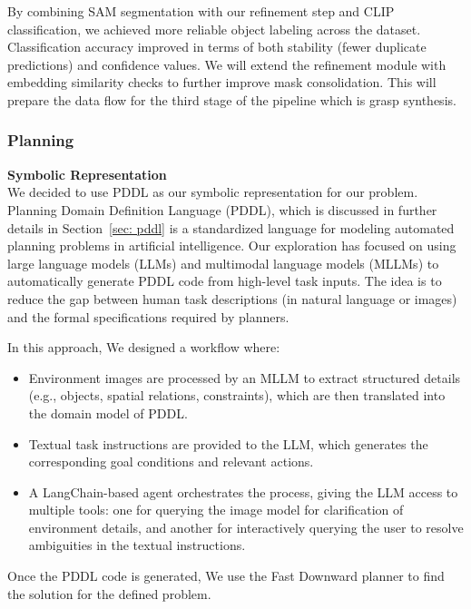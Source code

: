 \documentclass[12pt]{extarticle}
\begin{document}
By combining SAM segmentation with our refinement step and CLIP classification, we achieved more reliable object labeling across the dataset. Classification accuracy improved in terms of both stability (fewer duplicate predictions) and confidence values. We will extend the refinement module with embedding similarity checks to further improve mask consolidation. This will prepare the data flow for the third stage of the pipeline which is grasp synthesis.





\subsubsection{Planning}

\textbf{Symbolic Representation} \\
We decided to use PDDL as our symbolic representation for our problem. Planning Domain Definition Language (PDDL), which is discussed in further details in Section~\ref{sec: pddl} is a standardized language for modeling automated planning problems in artificial intelligence. Our exploration has focused on using large language models (LLMs) and multimodal language models (MLLMs) to automatically generate PDDL code from high-level task inputs. The idea is to reduce the gap between human task descriptions (in natural language or images) and the formal specifications required by planners.

In this approach, We designed a workflow where:
\begin{itemize}

\item Environment images are processed by an MLLM to extract structured details (e.g., objects, spatial relations, constraints), which are then translated into the domain model of PDDL.

\item Textual task instructions are provided to the LLM, which generates the corresponding goal conditions and relevant actions.

\item A LangChain-based agent orchestrates the process, giving the LLM access to multiple tools: one for querying the image model for clarification of environment details, and another for interactively querying the user to resolve ambiguities in the textual instructions.

\end{itemize}

Once the PDDL code is generated, We use the Fast Downward planner to find the solution for the defined problem.
\end{document}
